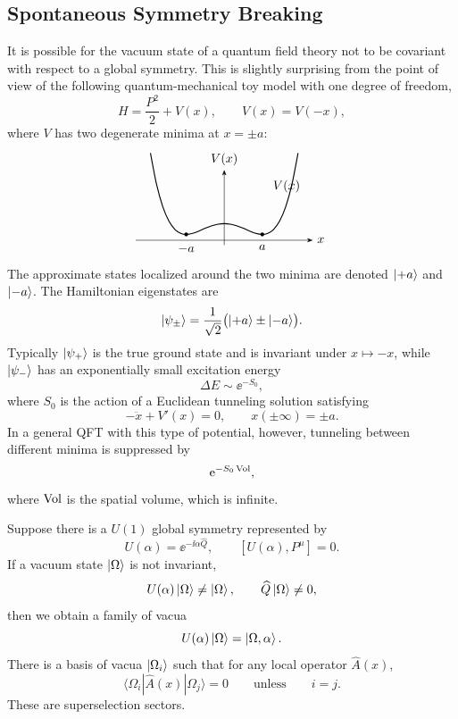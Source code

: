 \subsection{Spontaneous Symmetry Breaking}

It is possible for the vacuum state of a quantum field theory not to be
covariant with respect to a global symmetry.  This is slightly surprising
from the point of view of the following quantum-mechanical toy model with
one degree of freedom,
\[
  H=\frac{P^2}{2}+V(x),
  \qquad
  V(x)=V(-x),
\]
where \(V\) has two degenerate minima at \(x=\pm a\):
\[
\begin{tikzpicture}[>=Stealth,scale=0.92,baseline={(0,-0.1)}]
  \draw[->] (-2.7,0) -- (2.7,0) node[right] {\(x\)};
  \draw[->] (0,-0.15) -- (0,2.15) node[above] {\(V(x)\)};
  \draw[thick,domain=-2.25:2.25,smooth,variable=\x]
    plot ({\x},{0.18*(\x*\x-1.35)^2+0.18});
  \fill (-1.16,0.18) circle (1.6pt);
  \fill (1.16,0.18) circle (1.6pt);
  \node[below] at (-1.16,0) {\(-a\)};
  \node[below] at (1.16,0) {\(a\)};
  \node at (1.9,1.65) {\(V(x)\)};
\end{tikzpicture}
\]
The approximate states localized around the two minima are denoted
\(\ket{+a}\) and \(\ket{-a}\).  The Hamiltonian eigenstates are
\[
  \ket{\psi_\pm}
  =
  \frac1{\sqrt2}\bigl(\ket{+a}\pm\ket{-a}\bigr).
\]
Typically \(\ket{\psi_+}\) is the true ground state and is invariant
under \(x\mapsto -x\), while \(\ket{\psi_-}\) has an exponentially small
excitation energy
\[
  \Delta E\sim \ee^{-S_0},
\]
where \(S_0\) is the action of a Euclidean tunneling solution satisfying
\[
  -\ddot x+V'(x)=0,
  \qquad
  x(\pm\infty)=\pm a .
\]
In a general QFT with this type of potential, however, tunneling between
different minima is suppressed by
\[
  \mathrm{e}^{-S_0\,{\rm Vol}},
\]
where \({\rm Vol}\) is the spatial volume, which is infinite.

Suppose there is a \(U(1)\) global symmetry represented by
\[
  U(\alpha)=\ee^{-\ii\alpha\widehat Q},
  \qquad
  [U(\alpha),P^\mu]=0.
\]
If a vacuum state \(\ket\Omega\) is not invariant,
\[
  U(\alpha)\ket\Omega\ne\ket\Omega,
  \qquad
  \widehat Q\ket\Omega\ne0,
\]
then we obtain a family of vacua
\[
  U(\alpha)\ket\Omega=\ket{\Omega,\alpha}.
\]
There is a basis of vacua \(\ket{\Omega_i}\) such that for any local
operator \(\widehat A(x)\),
\[
  \langle\Omega_i|\widehat A(x)|\Omega_j\rangle=0
  \qquad\text{unless}\qquad i=j.
\]
These are superselection sectors.

